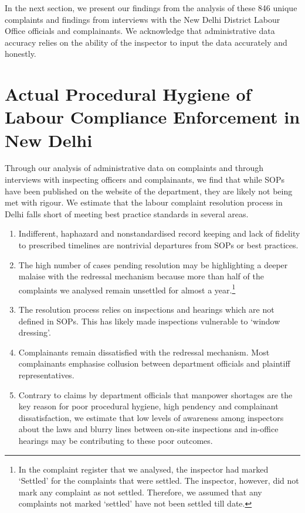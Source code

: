 \documentclass[a4paper, 12pt, twoside]{article}
\begin{document}
In the next section, we present our findings from the analysis of these 846 unique complaints and findings from interviews with the New Delhi District Labour Office officials and complainants. We acknowledge that administrative data accuracy relies on the ability of the inspector to input the data accurately and honestly.  

\section{Actual Procedural Hygiene of Labour Compliance Enforcement in New Delhi}\label{sec:3}

Through our analysis of administrative data on complaints and through interviews with inspecting officers and complainants, we find that while SOPs have been published on the website of the department, they are likely not being met with rigour. We estimate that the labour complaint resolution process in Delhi falls short of meeting best practice standards in several areas. 
\begin{enumerate}
\item Indifferent, haphazard and nonstandardised record keeping and lack of fidelity to prescribed timelines are nontrivial departures from SOPs or best practices.
\item The high number of cases pending resolution may be highlighting a deeper malaise with the redressal mechanism because more than half of the complaints we analysed remain unsettled for almost a year.\footnote{In the complaint register that we analysed, the inspector had marked ‘Settled’ for the complaints that were settled. The inspector, however, did not mark any complaint as not settled. Therefore, we assumed that any complaints not marked ‘settled’ have not been settled till date.}
\item The resolution process relies on inspections and hearings which are not defined in SOPs. This has likely made inspections vulnerable to ‘window dressing’.
\item Complainants remain dissatisfied with the redressal mechanism. Most complainants emphasise collusion between department officials and plaintiff representatives. 
\item Contrary to claims by department officials that manpower shortages are the key reason for poor procedural hygiene, high pendency and complainant dissatisfaction, we estimate that low levels of awareness among inspectors about the laws and blurry lines between on-site inspections and in-office hearings may be contributing to these poor outcomes. 
\end{enumerate}
\end{document}
